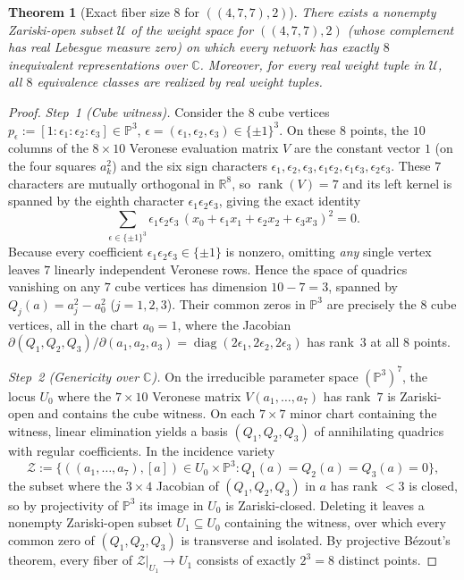 \documentclass[11pt]{article}
\theoremstyle{plain}
\newtheorem{theorem}{Theorem}
\theoremstyle{definition}
\theoremstyle{remark}
\DeclareMathOperator{\rank}{rank}
\DeclareMathOperator{\diag}{diag}
\begin{document}
\begin{theorem}[Exact fiber size $8$ for $((4, 7, 7), 2)$]\label{thm:shallow}
There exists a nonempty Zariski-open subset $\mathcal{U}$ of the weight space for $((4, 7, 7), 2)$ (whose complement has real Lebesgue measure zero) on which every network has \emph{exactly $8$} inequivalent representations over $\mathbb{C}$. Moreover, for every real weight tuple in $\mathcal{U}$, all $8$ equivalence classes are realized by real weight tuples.
\end{theorem}

\begin{proof}
\emph{Step~1 (Cube witness).} Consider the $8$ cube vertices $p_\epsilon := [1 : \epsilon_1 : \epsilon_2 : \epsilon_3] \in \mathbb{P}^3$, $\epsilon = (\epsilon_1, \epsilon_2, \epsilon_3) \in \{\pm 1\}^3$. On these $8$ points, the $10$ columns of the $8 \times 10$ Veronese evaluation matrix $V$ are the constant vector $1$ (on the four squares $a_k^2$) and the six sign characters $\epsilon_1, \epsilon_2, \epsilon_3, \epsilon_1\epsilon_2, \epsilon_1\epsilon_3, \epsilon_2\epsilon_3$. These $7$ characters are mutually orthogonal in $\mathbb{R}^8$, so $\rank(V) = 7$ and its left kernel is spanned by the eighth character $\epsilon_1\epsilon_2\epsilon_3$, giving the exact identity
\begin{equation}\label{eq:cube-syzygy}
\sum_{\epsilon \in \{\pm 1\}^3} \epsilon_1\epsilon_2\epsilon_3\,(x_0 + \epsilon_1 x_1 + \epsilon_2 x_2 + \epsilon_3 x_3)^2 = 0.
\end{equation}
Because every coefficient $\epsilon_1\epsilon_2\epsilon_3 \in \{\pm 1\}$ is nonzero, omitting \emph{any} single vertex leaves $7$ linearly independent Veronese rows. Hence the space of quadrics vanishing on any $7$ cube vertices has dimension $10 - 7 = 3$, spanned by $Q_j(a) = a_j^2 - a_0^2$ ($j = 1, 2, 3$). Their common zeros in $\mathbb{P}^3$ are precisely the $8$ cube vertices, all in the chart $a_0 = 1$, where the Jacobian $\partial(Q_1, Q_2, Q_3)/\partial(a_1, a_2, a_3) = \diag(2\epsilon_1, 2\epsilon_2, 2\epsilon_3)$ has rank~$3$ at all $8$ points.

\emph{Step~2 (Genericity over $\mathbb{C}$).} On the irreducible parameter space $(\mathbb{P}^3)^7$, the locus $U_0$ where the $7 \times 10$ Veronese matrix $V(a_1, \dots, a_7)$ has rank~$7$ is Zariski-open and contains the cube witness. On each $7 \times 7$ minor chart containing the witness, linear elimination yields a basis $(Q_1, Q_2, Q_3)$ of annihilating quadrics with regular coefficients. In the incidence variety
\[
\mathcal{Z} := \bigl\{((a_1, \dots, a_7), [a]) \in U_0 \times \mathbb{P}^3 : Q_1(a) = Q_2(a) = Q_3(a) = 0\bigr\},
\]
the subset where the $3 \times 4$ Jacobian of $(Q_1, Q_2, Q_3)$ in $a$ has rank $< 3$ is closed, so by projectivity of $\mathbb{P}^3$ its image in $U_0$ is Zariski-closed. Deleting it leaves a nonempty Zariski-open subset $U_1 \subseteq U_0$ containing the witness, over which every common zero of $(Q_1, Q_2, Q_3)$ is transverse and isolated. By projective B\'ezout's theorem, every fiber of $\mathcal{Z}|_{U_1} \to U_1$ consists of exactly $2^3 = 8$ distinct points.


\end{proof}
\end{document}
